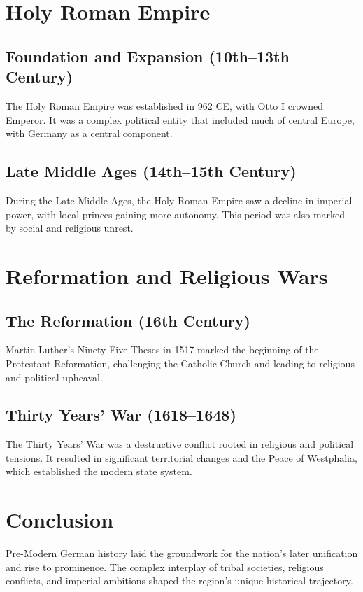 \documentclass[a4paper,12pt]{book}
\begin{document}
\section{Holy Roman Empire}
\label{sec:holy-roman-empire}
\subsection{Foundation and Expansion (10th–13th Century)}
The Holy Roman Empire was established in 962 CE, with Otto I crowned Emperor. It was a complex political entity that included much of central Europe, with Germany as a central component.

\subsection{Late Middle Ages (14th–15th Century)}
During the Late Middle Ages, the Holy Roman Empire saw a decline in imperial power, with local princes gaining more autonomy. This period was also marked by social and religious unrest.

\section{Reformation and Religious Wars}
\label{sec:reformation-religious-wars}
\subsection{The Reformation (16th Century)}
Martin Luther’s Ninety-Five Theses in 1517 marked the beginning of the Protestant Reformation, challenging the Catholic Church and leading to religious and political upheaval.

\subsection{Thirty Years’ War (1618–1648)}
The Thirty Years’ War was a destructive conflict rooted in religious and political tensions. It resulted in significant territorial changes and the Peace of Westphalia, which established the modern state system.

\section{Conclusion}
\label{sec:conclusion-pre-modern-germany}
Pre-Modern German history laid the groundwork for the nation’s later unification and rise to prominence. The complex interplay of tribal societies, religious conflicts, and imperial ambitions shaped the region’s unique historical trajectory.
\end{document}
